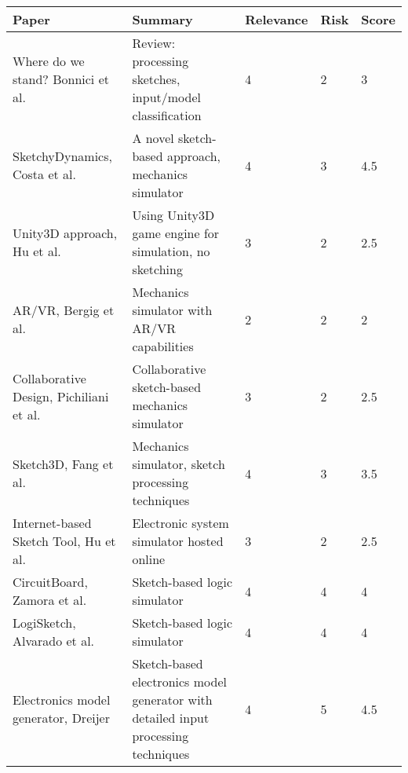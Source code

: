 \documentclass{article}
\begin{document}
\begin{table}[htpb]
  \footnotesize\centering
  \begin{tabular}{
    @{}
    l
    >{\raggedright\arraybackslash}p{7cm}
    l
    l
    l
    @{}
    }
    Paper                                                   & 
    Summary                                                 & Relevance & Risk & Score \\
    \midrule
    Where do we stand? Bonnici et al. \cite{101017S}        & 
    Review: processing sketches, input/model classification & 4         & 2    & 3     \\
    
    SketchyDynamics, Costa et al. \cite{109781I}            & 
    A novel sketch-based approach, mechanics simulator      & 4         & 3    & 4.5   \\
    
    Unity3D approach, Hu et al. \cite{6274802}              & 
    Using Unity3D game engine for simulation, no sketching  & 3         & 2    & 2.5   \\
    
    \gls{AR}/\gls{VR}, Bergig et al. \cite{5336490}         & 
    Mechanics simulator with \gls{AR}/\gls{VR} capabilities & 2         & 2    & 2     \\
    
    Collaborative Design, Pichiliani et al. \cite{5460522}  & 
    Collaborative sketch-based mechanics simulator          & 3         & 2    & 2.5   \\
    
    Sketch3D, Fang et al. \cite{4722231}                    & 
    Mechanics simulator, sketch processing techniques       & 4         & 3    & 3.5   \\
    
    Internet-based Sketch Tool, Hu et al. \cite{5432817}    & 
    Electronic system simulator hosted online               & 3         & 2    & 2.5   \\
    
    CircuitBoard, Zamora et al. \cite{20090001}             & 
    Sketch-based logic simulator                            & 4         & 4    & 4     \\
    
    LogiSketch, Alvarado et al. \cite{9155937}              & 
    Sketch-based logic simulator                            & 4         & 4    & 4     \\
    
    Electronics model generator, Dreijer \cite{dreijer}     & 
    Sketch-based electronics model generator with detailed 
    input processing techniques                             & 4         & 5    & 4.5   \\
    

\end{tabular}
\end{table}
\end{document}
